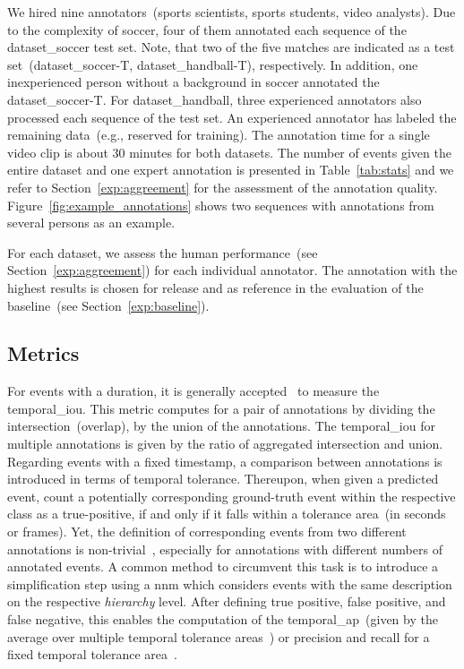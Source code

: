 We hired nine annotators~(sports scientists, sports students, video analysts). 
Due to the complexity of soccer, four of them annotated each sequence of the \acrshort{dataset_soccer} test set.
Note, that two of the five matches are indicated as a test set~(\acrshort{dataset_soccer}-T, \acrshort{dataset_handball}-T), respectively.
In addition, one inexperienced person without a background in soccer annotated the \acrshort{dataset_soccer}-T.
For \acrshort{dataset_handball}, three experienced annotators also processed each sequence of the test set.
An experienced annotator has labeled the remaining data~(e.g., reserved for training).
The annotation time for a single video clip is about 30 minutes for both datasets.
The number of events given the entire dataset and one expert annotation is presented in Table~\ref{tab:stats} and we refer to Section~\ref{exp:aggreement} for the assessment of the annotation quality.
Figure~\ref{fig:example_annotations} shows two sequences with annotations from several persons as an example.

For each dataset, we assess the human performance~(see Section~\ref{exp:aggreement}) for each individual annotator. The annotation with the highest results is chosen for release and as reference in the evaluation of the baseline~(see Section~\ref{exp:baseline}).

\subsection{Metrics}\label{sec:metrics}

For events with a duration, it is generally accepted~\cite{lin2019bmn, caba2015activitynet} to measure the \acrfull{temporal_iou}. 
This metric computes for a pair of annotations by dividing the intersection~(overlap), by the union of the annotations. The \acrshort{temporal_iou} for multiple annotations is given by the ratio of aggregated intersection and union. 
Regarding events with a fixed timestamp, a comparison between annotations is introduced in terms of temporal tolerance. Thereupon, when given a predicted event, count a potentially corresponding ground-truth event within the respective class as a true-positive, if and only if it falls within a tolerance area~(in seconds or frames). 
Yet, the definition of corresponding events from two different annotations is non-trivial~\cite{sanford2020group, deliege2020soccernet, giancola2018soccernet}, especially for annotations with different numbers of annotated events. 
A common method to circumvent this task is to introduce a simplification step using a \acrfull{nnm} which considers events with the same description on the respective \textit{hierarchy} level. 
After defining true positive, false positive, and false negative, this enables the computation of the \acrfull{temporal_ap}~(given by the average over multiple temporal tolerance areas~\cite{deliege2020soccernet, giancola2018soccernet}) or precision and recall for a fixed temporal tolerance area~\cite{sanford2020group}.

